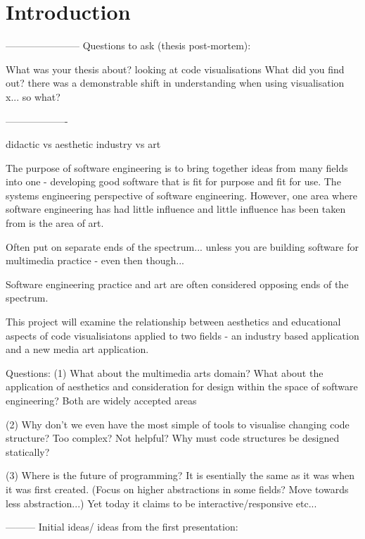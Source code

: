 
\chapter{Introduction}
\label{cha:intro}


-----------------------
Questions to ask (thesis post-mortem):

What was your thesis about? looking at code visualisations
What did you find out? there was a demonstrable shift in understanding when using visualisation x... so what? 



-------------------


didactic vs aesthetic
industry vs art

The purpose of software engineering is to bring together ideas from many fields into one - developing good software that is fit for purpose and fit for use. The systems engineering perspective of software engineering. However, one area where software engineering has had little influence and little influence has been taken from is the area of art.


Often put on separate ends of the spectrum... unless you are building software for multimedia practice - even then though...




Software engineering practice and art are often considered opposing ends of the spectrum. 

This project will examine the relationship between aesthetics and educational aspects of code visualisiatons applied to two fields - an industry based application and a new media art application. 

Questions:
(1) What about the multimedia arts domain? What about the application of aesthetics and consideration for design within the space of software engineering? Both are widely accepted areas

(2) Why don't we even have the most simple of tools to visualise changing code structure? Too complex? Not helpful? Why must code structures be designed statically?

(3) Where is the future of programming? It is esentially the same as it was when it was first created. (Focus on higher abstractions in some fields? Move towards less abstraction...) Yet today it claims to be interactive/responsive etc...



---------
Initial ideas/ ideas from the first presentation:

